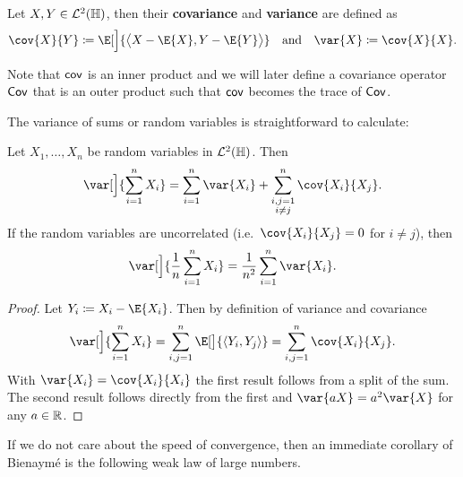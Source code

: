 \begin{definition}[Covariance]
    \label{def: covariance and variance definition}
    Let \(X, Y \in \mathcal{L}^2(\mathbb{H})\), then their \textbf{covariance}
    and \textbf{variance} are defined as
    \[
        \cov{X}{Y} \coloneq \E[\Big]{\scp[\big]{X-\E{X}, Y-\E{Y}}}
        \quad \text{and} \quad
        \var{X} \coloneq \cov{X}{X}.
    \]
\end{definition}

\begin{remark}
Note that \(\mathsf{cov}\) is an inner product and we will later define
a covariance operator \(\mathsf{Cov}\) that is an outer product such that \(\mathsf{cov}\)
becomes the trace of \(\mathsf{Cov}\).
\end{remark}
The variance of sums or random variables is straightforward to calculate:

\begin{mdframed}[innertopmargin=0pt]
\begin{lemma}[Bienaymé]
    \label{lem: Bienaymé}
    Let \(X_1, \dots, X_n\) be random variables in \(\mathcal{L}^2(\mathbb{H})\). Then
    \[
        \var[\Big]{\sum_{i=1}^n X_i} = \sum_{i=1}^n \var{X_i} + \sum_{\substack{i,j=1\\i \neq j}}^n \cov{X_i}{X_j}.
    \]
    If the random variables are uncorrelated (i.e.\ \(\cov{X_i}{X_j} = 0\) for \(i\neq j\)), then
    \[
        \var[\Big]{\frac1n \sum_{i=1}^n X_i} = \frac1{n^2} \sum_{i=1}^n \var{X_i}.
    \]
\end{lemma}
\end{mdframed}

\begin{proof}
    Let \(Y_i \coloneq X_i - \E{X_i}\). Then by definition of variance and covariance
    \[
        \var[\Big]{\sum_{i=1}^n X_i}
        = \sum_{i,j=1}^n \E[\big]{\scp{Y_i, Y_j}}
        = \sum_{i,j=1}^n \cov{X_i}{X_j}.
    \]
    With \(\var{X_i} = \cov{X_i}{X_i}\) the first result follows from a split of the sum.
    The second result follows directly from the first and
    \(
        \var{aX} = a^2 \var{X}
    \) for any \(a\in \mathbb{R}\).
\end{proof}

If we do not care about the speed of convergence, then an immediate corollary of
Bienaymé is the following weak law of large numbers.

